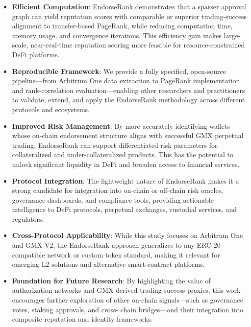 \begin{itemize}
\item[\textbullet] \textbf{Efficient Computation}: EndorseRank demonstrates that a sparser approval graph can yield reputation scores with comparable or superior trading-success alignment to transfer-based PageRank, while reducing computation time, memory usage, and convergence iterations. This efficiency gain makes large-scale, near-real-time reputation scoring more feasible for resource-constrained DeFi platforms.
\item[\textbullet] \textbf{Reproducible Framework}: We provide a fully specified, open-source pipeline---from Arbitrum One data extraction to PageRank implementation and rank-correlation evaluation---enabling other researchers and practitioners to validate, extend, and apply the EndorseRank methodology across different protocols and ecosystems.
\end{itemize}

\begin{itemize}
\item[\textbullet] \textbf{Improved Risk Management}: By more accurately identifying wallets whose on-chain endorsement structure aligns with successful GMX perpetual trading, EndorseRank can support differentiated risk parameters for collateralized and under-collateralized products. This has the potential to unlock significant liquidity in DeFi and broaden access to financial services.
\item[\textbullet] \textbf{Protocol Integration}: The lightweight nature of EndorseRank makes it a strong candidate for integration into on-chain or off-chain risk oracles, governance dashboards, and compliance tools, providing actionable intelligence to DeFi protocols, perpetual exchanges, custodial services, and regulators.
\end{itemize}

\begin{itemize}
\item[\textbullet] \textbf{Cross-Protocol Applicability}: While this study focuses on Arbitrum One and GMX V2, the EndorseRank approach generalizes to any ERC-20--compatible network or custom token standard, making it relevant for emerging L2 solutions and alternative smart-contract platforms.
\item[\textbullet] \textbf{Foundation for Future Research}: By highlighting the value of authorization networks and GMX-derived trading-success proxies, this work encourages further exploration of other on-chain signals---such as governance votes, staking approvals, and cross- chain bridges---and their integration into composite reputation and identity frameworks.
\end{itemize}
